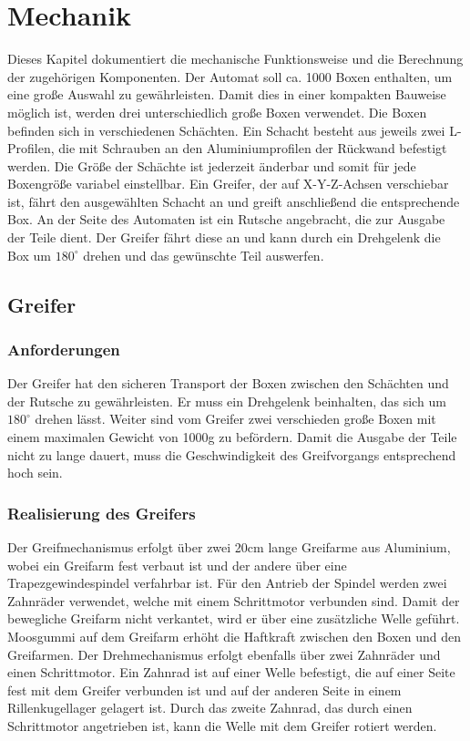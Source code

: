 \documentclass{scrartcl}
\begin{document}
\section{Mechanik}
\label{Mechanik}
Dieses Kapitel dokumentiert die mechanische Funktionsweise und die Berechnung der zugehörigen Komponenten. Der Automat soll ca. 1000 Boxen enthalten, um eine große Auswahl zu gewährleisten. Damit dies in einer kompakten Bauweise möglich ist, werden drei unterschiedlich große Boxen verwendet. Die Boxen befinden sich in verschiedenen Schächten. 
Ein Schacht besteht aus jeweils zwei L-Profilen, die mit Schrauben an den Aluminiumprofilen der Rückwand befestigt werden. Die Größe der Schächte ist jederzeit änderbar und somit für jede Boxengröße variabel einstellbar. Ein Greifer, der auf X-Y-Z-Achsen verschiebar ist, fährt den ausgewählten Schacht an und greift anschließend die entsprechende Box. An der Seite des Automaten ist ein Rutsche angebracht, die zur Ausgabe der Teile dient. Der Greifer fährt diese an und kann durch ein Drehgelenk die Box um $180^\circ$ drehen und das gewünschte Teil auswerfen.


\subsection{Greifer}

\subsubsection{Anforderungen}


Der Greifer hat den sicheren Transport der Boxen zwischen den Schächten und der Rutsche zu gewährleisten. Er muss ein Drehgelenk beinhalten, das sich um $180^\circ$ drehen lässt. Weiter sind vom Greifer zwei verschieden große Boxen mit einem maximalen Gewicht von 1000g zu befördern. Damit die Ausgabe der Teile nicht zu lange dauert, muss die Geschwindigkeit des Greifvorgangs entsprechend hoch sein.


\subsubsection{Realisierung des Greifers}

Der Greifmechanismus erfolgt über zwei 20cm lange Greifarme aus Aluminium, wobei ein Greifarm fest verbaut ist und der andere über eine Trapezgewindespindel verfahrbar ist. Für den Antrieb der Spindel werden zwei Zahnräder verwendet, welche mit einem Schrittmotor verbunden sind. Damit der bewegliche Greifarm nicht verkantet, wird er über eine zusätzliche Welle geführt. Moosgummi auf dem Greifarm erhöht die Haftkraft zwischen den Boxen und den Greifarmen. Der Drehmechanismus erfolgt ebenfalls über zwei Zahnräder und einen Schrittmotor. Ein Zahnrad ist auf einer Welle befestigt, die auf einer Seite fest mit dem Greifer verbunden ist und auf der anderen Seite in einem Rillenkugellager gelagert ist. Durch das zweite Zahnrad, das durch einen Schrittmotor angetrieben ist, kann die Welle  mit dem Greifer rotiert werden. 
\end{document}
